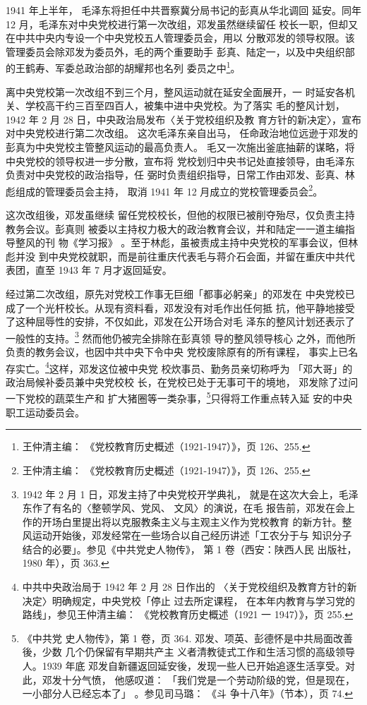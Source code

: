 1941 年上半年，
毛泽东将担任中共晋察冀分局书记的彭真从华北调回
延安。同年 12 月，毛泽东对中央党校进行第一次改组，邓发虽然继续留任
校长一职，但却又在中共中央内专设一个中央党校五人管理委员会，用以
分散邓发的领导权限。该管理委员会除邓发为委员外，毛的两个重要助手
彭真、陆定一，以及中央组织部的王鹤寿、军委总政治部的胡耀邦也名列
委员之中\footnote{王仲清主编：
《党校教育历史概述（1921-1947）》，页 126、255.}。

离中央党校第一次改组不到三个月，整风运动就在延安全面展开，一
时延安各机关、学校高干约三百至四百人，被集中进中央党校。为了落实
毛的整风计划，1942 年 2 月 28 日，中央政治局发布〈关于党校组织及教
育方针的新决定〉，宣布对中央党校进行第二次改组。
这次毛泽东亲自出马，
任命政治地位远逊于邓发的彭真为中央党校主管整风运动的最高负责人。
毛又一次施出釜底抽薪的谋略，将中央党校的领导权进一步分散，宣布将
党校划归中央书记处直接领导，由毛泽东负责对中央党校的政治指导，任
弼时负责组织指导，日常工作由邓发、彭真、林彪组成的管理委员会主持，
取消 1941 年 12 月成立的党校管理委员会\footnote{王仲清主编：
《党校教育历史概述（1921-1947）》，页 126、255.}。

这次改组後，邓发虽继续
留任党校校长，但他的权限已被削夺殆尽，仅负责主持教务会议。彭真则
被委以主持权力极大的政治教育会议，并和陆定一一道主编指导整风的刊
物《学习报》
。至于林彪，虽被责成主持中央党校的军事会议，但林彪并没
到中央党校就职，而是前往重庆代表毛与蒋介石会面，并留在重庆中共代
表团，直至 1943 年 7 月才返回延安。

经过第二次改组，原先对党校工作事无巨细「都事必躬亲」的邓发在 中央党校已
成了一个光杆校长。从现有资料看，邓发没有对毛作出任何抵 抗，他平静地接受
了这种屈辱性的安排，不仅如此，邓发在公开场合对毛 泽东的整风计划还表示了
一般性的支持。\footnote{1942 年 2 月 1 日，邓发主持了中央党校开学典礼，
就是在这次大会上，毛泽东作了有名的〈整顿学风、党风、 文风〉的演说，在毛
报告前，邓发在会上作的开场白里提出将以克服教条主义与主观主义作为党校教育
的新方针。整 风运动开始後，邓发经常在一些场合以自己经历讲述「工农分于与
知识分子结合的必要」。参见《中共党史人物传》， 第 1 卷（西安：陕西人民
出版社，1980 年），页 363.} 然而他仍被完全排除在彭真领 导的整风领导核心
之外，而他所负责的教务会议，也因中共中央下令中央 党校废除原有的所有课程，
事实上已名存实亡。\footnote{中共中央政治局于 1942 年 2 月 28 日作出的
〈关于党校组织及教育方针的新决定〉明确规定，中央党校「停止 过去所定课程，
在本年内教育与学习党的路线」，参见王仲清主编： 《党校教育历史概述（1921
一 1947）》，页 255.}这样，邓发这位被中央党 校炊事员、勤务员亲切称呼为
「邓大哥」的政治局候补委员兼中央党校校 长，在党校已处于无事可干的境地，
邓发除了过问一下党校的蔬菜生产和 扩大猪圈等一类杂事，\footnote{《中共党
史人物传》，第 1 卷，页 364.  邓发、项英、彭德怀是中共局面改善後，少数
几个仍保留有早期共产主 义者清教徒式工作和生活习惯的高级领导人。1939 年底
邓发自新疆返回延安後，发现一些人已开始追逐生活享受。对 此，邓发十分气愤，
他感叹道： 「我们党是一个劳动阶级的党，但是现在，一小部分人已经忘本了」
。参见司马璐： 《斗 争十八年》（节本），页 74.  }只得将工作重点转入延
安的中央职工运动委员会。

